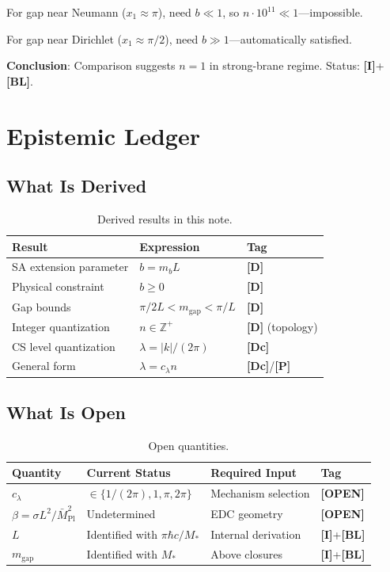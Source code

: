 \documentclass[11pt,a4paper]{article}
\newcommand{\Mpl}{\bar{M}_{\mathrm{Pl}}}
\newcommand{\mgap}{m_{\mathrm{gap}}}
\newcommand{\mb}{m_b}
\newcommand{\tagD}{\textbf{[D]}}
\newcommand{\tagDc}{\textbf{[Dc]}}
\newcommand{\tagI}{\textbf{[I]}}
\newcommand{\tagBL}{\textbf{[BL]}}
\newcommand{\tagP}{\textbf{[P]}}
\newcommand{\tagOPEN}{\textbf{[OPEN]}}
\theoremstyle{definition}
\theoremstyle{plain}
\theoremstyle{remark}
\begin{document}
For gap near Neumann ($x_1 \approx \pi$), need $b \ll 1$, so $n \cdot 10^{11} \ll 1$---impossible.

For gap near Dirichlet ($x_1 \approx \pi/2$), need $b \gg 1$---automatically satisfied.

\textbf{Conclusion}: Comparison suggests $n = 1$ in strong-brane regime. Status: \tagI{}+\tagBL{}.

\section{Epistemic Ledger}
\label{sec:ledger}

\subsection{What Is Derived}

\begin{table}[htbp]
\centering
\caption{Derived results in this note.}
\label{tab:derived}
\begin{tabular}{@{}lll@{}}
\toprule
Result & Expression & Tag \\
\midrule
SA extension parameter & $b = \mb L$ & \tagD{} \\
Physical constraint & $b \geq 0$ & \tagD{} \\
Gap bounds & $\pi/2L < \mgap < \pi/L$ & \tagD{} \\
Integer quantization & $n \in \mathbb{Z}^+$ & \tagD{} (topology) \\
CS level quantization & $\lambda = |k|/(2\pi)$ & \tagDc{} \\
General form & $\lambda = c_\lambda n$ & \tagDc{}/\tagP{} \\
\bottomrule
\end{tabular}
\end{table}

\subsection{What Is Open}

\begin{table}[htbp]
\centering
\caption{Open quantities.}
\label{tab:open}
\begin{tabular}{@{}llll@{}}
\toprule
Quantity & Current Status & Required Input & Tag \\
\midrule
$c_\lambda$ & $\in \{1/(2\pi), 1, \pi, 2\pi\}$ & Mechanism selection & \tagOPEN{} \\
$\beta = \sigma L^2/\Mpl^2$ & Undetermined & EDC geometry & \tagOPEN{} \\
$L$ & Identified with $\pi\hbar c/M_*$ & Internal derivation & \tagI{}+\tagBL{} \\
$\mgap$ & Identified with $M_*$ & Above closures & \tagI{}+\tagBL{} \\
\bottomrule
\end{tabular}
\end{table}
\end{document}
